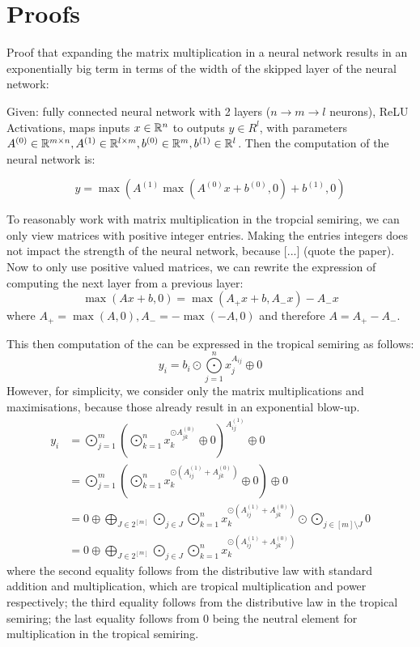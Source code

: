 \chapter{Proofs}

Proof that expanding the matrix multiplication in a neural network results in an exponentially big term in terms of the width of the skipped layer of the neural network:

Given: fully connected neural network with 2 layers ($n \rightarrow m \rightarrow l$ neurons), ReLU Activations, maps inputs $x \in \mathbb{R}^n$ to outputs $y \in R^l$, with parameters $A^{(0)} \in \mathbb{R}^{m \times n}, A^{(1)} \in \mathbb{R}^{l \times m}, b^{(0)} \in \mathbb{R}^m, b^{(1)} \in \mathbb{R}^l$.
Then the computation of the neural network is:

$$y = \max(A^{(1)}\max(A^{(0)}x + b^{(0)}, 0) + b^{(1)}, 0)$$

To reasonably work with matrix multiplication in the tropcial semiring, we can only view matrices with positive integer entries.
Making the entries integers does not impact the strength of the neural network, because [...] (quote the paper).
Now to only use positive valued matrices, we can rewrite the expression of computing the next layer from a previous layer:
$$\max(Ax + b, 0) = \max(A_+ x + b, A_- x) - A_- x$$
where $A_+ = \max(A, 0), A_- = -\max(-A, 0)$ and therefore $A = A_+ - A_-$.

This then computation of the can be expressed in the tropical semiring as follows:
$$y_i = b_i \odot \bigodot\limits_{j = 1}^{n} x_j^{A_{ij}} \oplus 0$$
However, for simplicity, we consider only the matrix multiplications and maximisations, because those already result in an exponential blow-up.
\begin{align*}
    y_i & = \bigodot\limits_{j = 1}^{m} \left(\bigodot\limits_{k = 1}^{n} x_k^{\odot A^{(0)}_{jk}} \oplus 0\right)^{A^{(1)}_{ij}} \oplus 0 \\
        & = \bigodot\limits_{j = 1}^{m} \left(\bigodot\limits_{k = 1}^{n} x_k^{\odot (A^{(1)}_{ij} + A^{(0)}_{jk})} \oplus 0\right) \oplus 0 \\
        & = 0 \oplus \bigoplus\limits_{J \in 2^{[m]}} \bigodot\limits_{j \in J} \bigodot\limits_{k = 1}^{n} x_k^{\odot (A^{(1)}_{ij} + A^{(0)}_{jk})} \odot \bigodot\limits_{j \in [m] \setminus J} 0\\
        & = 0 \oplus \bigoplus\limits_{J \in 2^{[m]}} \bigodot\limits_{j \in J} \bigodot\limits_{k = 1}^{n} x_k^{\odot (A^{(1)}_{ij} + A^{(0)}_{jk})}
\end{align*}
where the second equality follows from the distributive law with standard addition and multiplication, which are tropical multiplication and power respectively;
the third equality follows from the distributive law in the tropical semiring;
the last equality follows from 0 being the neutral element for multiplication in the tropical semiring.

